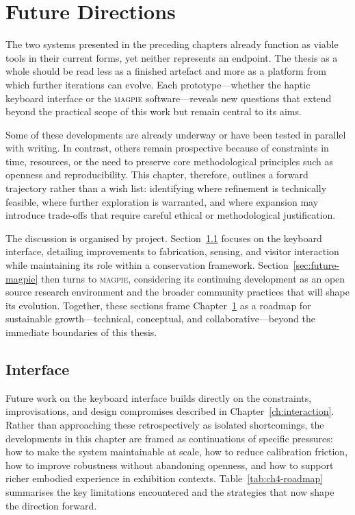\chapter{Future Directions}\label{ch:future}

The two systems presented in the preceding chapters already function as viable tools in their current forms, yet neither represents an endpoint. The thesis as a whole should be read less as a finished artefact and more as a platform from which further iterations can evolve. Each prototype—whether the haptic keyboard interface or the \textsc{magpie} software—reveals new questions that extend beyond the practical scope of this work but remain central to its aims.

Some of these developments are already underway or have been tested in parallel with writing. In contrast, others remain prospective because of constraints in time, resources, or the need to preserve core methodological principles such as openness and reproducibility. This chapter, therefore, outlines a forward trajectory rather than a wish list: identifying where refinement is technically feasible, where further exploration is warranted, and where expansion may introduce trade-offs that require careful ethical or methodological justification.

The discussion is organised by project. Section~\ref{sec:future-interaction} focuses on the keyboard interface, detailing improvements to fabrication, sensing, and visitor interaction while maintaining its role within a conservation framework. Section~\ref{sec:future-magpie} then turns to \textsc{magpie}, considering its continuing development as an open source research environment and the broader community practices that will shape its evolution. Together, these sections frame Chapter~\ref{ch:future} as a roadmap for sustainable growth—technical, conceptual, and collaborative—beyond the immediate boundaries of this thesis.


\section{Interface}\label{sec:future-interaction}

Future work on the keyboard interface builds directly on the constraints, improvisations, and design compromises described in Chapter~\ref{ch:interaction}. Rather than approaching these retrospectively as isolated shortcomings, the developments in this chapter are framed as continuations of specific pressures: how to make the system maintainable at scale, how to reduce calibration friction, how to improve robustness without abandoning openness, and how to support richer embodied experience in exhibition contexts. Table~\ref{tab:ch4-roadmap} summarises the key limitations encountered and the strategies that now shape the direction forward.


